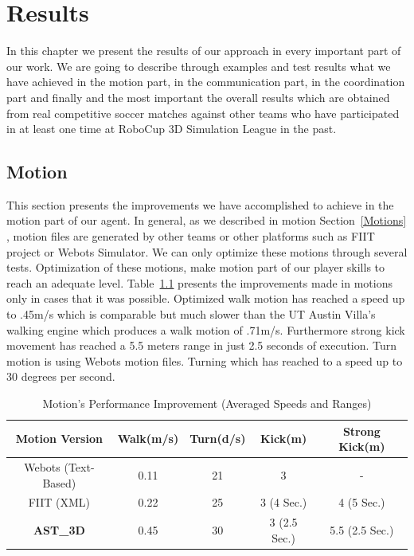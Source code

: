 \chapter{Results}
\label{results}
In this chapter we present the results of our approach in every important part of our work. We are going to describe through examples and test results what we have achieved in the motion part, in the communication part, in the coordination part and finally and the most important the overall results which are obtained from real competitive soccer matches against other teams who have participated in at least one time at RoboCup 3D Simulation League in the past.


\section{Motion}
This section presents the improvements we have accomplished to achieve in the motion part of our agent. In general, as we described in motion Section~\ref{Motions} , motion files are generated by other teams or other platforms such as FIIT project or Webots Simulator. We can only optimize these motions through several tests. Optimization of these motions, make motion part of our player skills to reach an adequate level. Table~\ref{MotionImprovements} presents the improvements made in motions only in cases that it was possible. Optimized walk motion has reached a speed up to .45m/s which is comparable but much slower than the UT Austin Villa's walking engine which produces a walk motion of .71m/s. Furthermore strong kick movement has reached a 5.5 meters range in just 2.5 seconds of execution. Turn motion is using Webots motion files. Turning which has reached to a speed up to 30 degrees per second. 

\begin{table}[t!]
\caption{Motion's Performance Improvement (Averaged Speeds and Ranges)}
\label{MotionImprovements}
\begin{center}
\begin{small}
\begin{tabular}{ccccc}
\textbf{Motion Version} & \textbf{Walk(m/s)}	& \textbf{Turn(d/s)}	& \textbf{Kick(m)}&\textbf{Strong Kick(m)} \\
\midrule
Webots (Text-Based) 		& 0.11 				& 21 				& 3 				& - \\
FIIT (XML)				& 0.22 				& 25 				& 3 (4 Sec.) 		& 4 (5 Sec.) \\
\textbf{AST\_3D} 		& 0.45 	& 30 		& 3 (2.5 Sec.)& 5.5 (2.5 Sec.) \\
\end{tabular}
\end{small}
\end{center}
\end{table}




